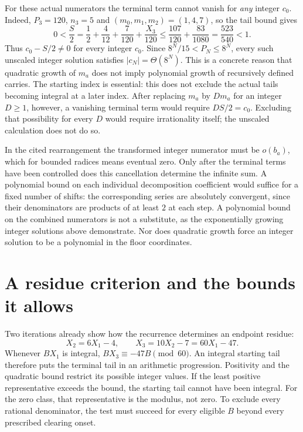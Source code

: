 For these actual numerators the terminal term cannot vanish for
\emph{any} integer $c_0$.  Indeed, $P_3=120$, $n_3=5$ and
$(m_0,m_1,m_2)=(1,4,7)$, so the tail bound gives
\[
 0<\frac S2
 =\frac12+\frac4{12}+\frac7{120}+\frac{X_3}{120}
 \le\frac{107}{120}+\frac{83}{1080}
 =\frac{523}{540}<1.
\]
Thus $c_0-S/2\ne0$ for every integer $c_0$.  Since
$8^N/15<P_N\le8^N$, every such unscaled integer solution satisfies
$|c_N|=\Theta(8^N)$.  This is a concrete reason that quadratic growth of
$m_a$ does not imply polynomial growth of recursively defined carries.
The starting index is essential: this does not exclude the actual tails
becoming integral at a later index.  After replacing $m_a$ by $D m_a$ for an integer $D\ge1$, however, a
vanishing terminal term would require $DS/2=c_0$.  Excluding that
possibility for every $D$ would require irrationality itself; the
unscaled calculation does not do so.

In the cited rearrangement the transformed integer numerator must be
$o(b_a)$, which for bounded radices means eventual zero.  Only after the
terminal terms have been controlled does this cancellation determine the
infinite sum.  A polynomial bound on each individual decomposition
coefficient would suffice for a fixed number of shifts: the corresponding
series are absolutely convergent, since their denominators are products
of at least $2$ at each step.  A polynomial bound on the combined
numerators is not a substitute, as the exponentially growing integer solutions above demonstrate.  Nor does quadratic growth force an integer solution to be a polynomial in the floor coordinates.

\section{A residue criterion and the bounds it allows}\label{long269:sec:escape}

Two iterations already show how the recurrence determines an endpoint
residue:
\[
 X_2=6X_1-4,\qquad X_3=10X_2-7=60X_1-47.
\]
Whenever $BX_1$ is integral, $BX_3\equiv-47B\pmod{60}$.
An integral starting tail therefore puts the terminal tail in an
arithmetic progression. Positivity and the quadratic bound restrict its
possible integer values. If the least positive representative exceeds
the bound, the starting tail cannot have been integral. For the zero
class, that representative is the modulus, not zero. To exclude every
rational denominator, the test must succeed for every eligible $B$
beyond every prescribed clearing onset.

